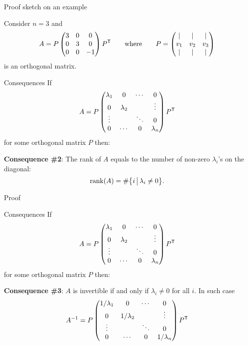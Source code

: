 \documentclass{beamer}
\begin{document}
\begin{frame}[t]{Proof sketch on an example}
	\grid

	Consider $n=3$ and 
	$$
	A = P
	\begin{pmatrix}
		3 & 0 &  0 \\
		0 & 3 & 0 \\
		0 & 0 & -1 
	\end{pmatrix}
	P^{{\sf T}}
	\qquad
	\text{where}
	\qquad
	P=
	\begin{pmatrix}
		| & | &  | \\
		v_1 & v_2 & v_3 \\
		| & | & |
	\end{pmatrix}
	$$
	is an orthogonal matrix.
\\

\end{frame}
\begin{frame}[t]{Consequences}
	If 
	$$
	A = P
	\begin{pmatrix}
		\lambda_1 & 0 & \cdots & 0 \\
		0 & \lambda_2 & & \vdots \\
		\vdots &  & \ddots & 0 \\
		0 & \cdots & 0 & \lambda_n \\
	\end{pmatrix}
	P^{{\sf T}}
	$$
	for some orthogonal matrix $P$ then:

	\vspace{1cm}

\textbf{Consequence \#2}: The rank of $A$ equals to the number of non-zero $\lambda_i$'s on the diagonal:
$$
{{\rm rank}}(A) = \# \big\{ i \, \big| \, \lambda_i \neq 0 \big\}.
$$
\end{frame}
\begin{frame}[t]{Proof}
	\grid

\end{frame}
\begin{frame}[t]{Consequences}
	If 
	$$
	A = P
	\begin{pmatrix}
		\lambda_1 & 0 & \cdots & 0 \\
		0 & \lambda_2 & & \vdots \\
		\vdots &  & \ddots & 0 \\
		0 & \cdots & 0 & \lambda_n \\
	\end{pmatrix}
	P^{{\sf T}}
	$$
	for some orthogonal matrix $P$ then:

	\vspace{1cm}

	\textbf{Consequence \#3}: $A$ is invertible if and only if $\lambda_i \neq 0$ for all $i$. In such case
	$$
	A^{-1} = P
	\begin{pmatrix}
		1/\lambda_1 & 0 & \cdots & 0 \\
		0 & 1/\lambda_2 & & \vdots \\
		\vdots &  & \ddots & 0 \\
		0 & \cdots & 0 & 1/\lambda_n \\
	\end{pmatrix}
	P^{{\sf T}}
	$$
\end{frame}
\end{document}
